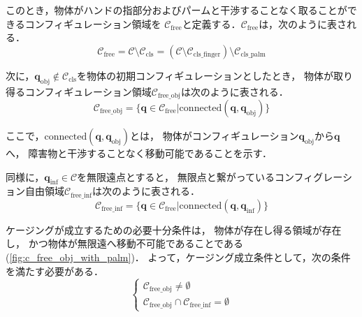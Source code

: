\documentclass[a4paper,twoside,12pt,papersize, dvipdfmx]{iirthesis}
\begin{document}
このとき，物体がハンドの指部分およびパームと干渉することなく取ることができるコンフィギュレーション領域を
$\mathcal{C}_{\mathrm{free}}$と定義する．$\mathcal{C}_{\mathrm{free}}$は，次のように表される．
\begin{equation}
\mathcal{C}_{\mathrm{free}} = \mathcal{C} \setminus  \mathcal{C}_{\mathrm{cls}}
 = \left(\mathcal{C} \setminus  \mathcal{C}_{\mathrm{cls\_finger}}\right) \setminus \mathcal{C}_{\mathrm{cls\_palm}}
\end{equation}

次に，$\bm{q}_{\mathrm{obj}}\not\in \mathcal{C}_{\mathrm{cls}}$を物体の初期コンフィギュレーションとしたとき，
物体が取り得るコンフィギュレーション領域$\mathcal{C}_{\mathrm{free\_obj}}$は次のように表される．
\begin{equation}
\mathcal{C}_{\mathrm{free\_obj}} = \{ \bm{q} \in \mathcal{C}_{\mathrm{free}} | \mathrm{connected} (\bm{q},\bm{q}_{\mathrm{obj}}) \}
\end{equation}

ここで，$\mathrm{connected} (\bm{q},\bm{q}_{\mathrm{obj}})$とは，
物体がコンフィギュレーション$\bm{q}_{\mathrm{obj}}$から$\bm{q}$へ，
障害物と干渉することなく移動可能であることを示す．

同様に，$\bm{q}_{\mathrm{inf}}\in \mathcal{C}$を無限遠点とすると，
無限点と繋がっているコンフィグレーション自由領域$\mathcal{C}_{\mathrm{free\_inf}}$は次のように表される．
\begin{equation}
\mathcal{C}_{\mathrm{free\_inf}} = \{ \bm{q} \in \mathcal{C}_{\mathrm{free}} | \mathrm{connected} (\bm{q},\bm{q}_{\mathrm{inf}}) \}
\end{equation}

ケージングが成立するための必要十分条件は，
物体が存在し得る領域が存在し，
かつ物体が無限遠へ移動不可能であることである(\figurename\ref{fig:c_free_obj_with_palm})．
よって，ケージング成立条件として，次の条件を満たす必要がある．
\begin{equation}
\begin{cases}
\mathcal{C}_{\mathrm{free\_obj}} \neq \emptyset \\
\mathcal{C}_{\mathrm{free\_obj}} \cap \mathcal{C}_{\mathrm{free\_inf}} = \emptyset
\end{cases}
\label{eq:object_closure}
\end{equation} 

\end{document}
